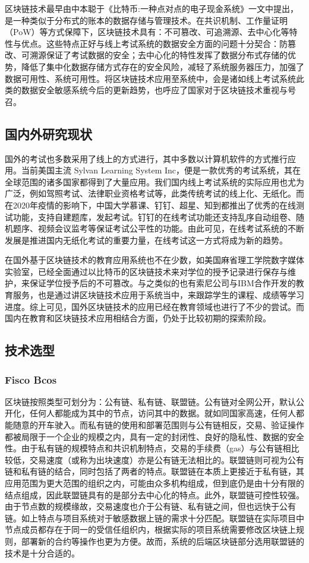 区块链技术最早由中本聪于《比特币:一种点对点的电子现金系统》一文中提出，是一种类似于分布式的账本的数据存储与管理技术。在共识机制、工作量证明（PoW）等方式保障下，区块链技术具有：不可篡改、可追溯源、去中心化等特性与优点。这些特点正好与线上考试系统的数据安全方面的问题十分契合：防篡改、可溯源保证了考试数据的安全；去中心化的特性发挥了数据分布式存储的优势，降低了集中化数据存储方式存在的安全风险，减轻了系统服务器压力，加强了数据可用性、系统可用性。将区块链技术应用至系统中，会是诸如线上考试系统此类的数据安全敏感系统今后的更新趋势，也呼应了国家对于区块链技术重视与号召。

\subsection{国内外研究现状}
国外的考试也多数采用了线上的方式进行，其中多数以计算机软件的方式推行应用。当前美国主流 Sylvan Learning System Inc，便是一款优秀的考试系统，其在全球范围的诸多国家都得到了大量应用。我们国内线上考试系统的实际应用也尤为广泛，例如驾照考试、法律职业资格考试等，此类传统考试的线上化、无纸化。而在2020年疫情的影响下，中国大学慕课、钉钉、超星、知到都推出了优秀的在线测试功能，支持自建题库，发起考试。钉钉的在线考试功能还支持乱序自动组卷、随机题序、视频会议监考等保证考试公平性的功能。由此可见，在线考试系统的不断发展是推进国内无纸化考试的重要力量，在线考试这一方式将成为新的趋势。

在国外基于区块链技术的教育应用系统也不在少数，如美国麻省理工学院数字媒体实验室，已经全面通过以比特币的区块链技术来对学位的授予记录进行保存与维护，来保证学位授予后的不可篡改。与之类似的也有索尼公司与IBM合作开发的教育服务，也是通过讲区块链技术应用于系统当中，来跟踪学生的课程、成绩等学习进度。综上可见，国外区块链技术的应用已经在教育领域也进行了不少的尝试。而国内在教育和区块链技术应用相结合方面，仍处于比较初期的探索阶段。

\subsection{技术选型}
\subsubsection{Fisco Bcos}
区块链按照类型可划分为：公有链、私有链、联盟链。公有链对全网公开，默认公开化，任何人都能成为其中的节点，访问其中的数据。就如同国家高速，任何人都能随意的开车驶入。而私有链的使用和部署范围则与公有链相反，交易、验证操作都被局限于一个企业的规模之内，具有一定的封闭性、良好的隐私性、数据的安全性。由于私有链的规模特点和共识机制特点，交易的手续费（gas）与公有链相比较低，交易速度（或称为出块速度）亦是公有链无法相比的。联盟链则可视为公有链和私有链的结合，同时包括了两者的特点。联盟链在本质上更接近于私有链，其应用范围为更大范围的组织之内，可能由众多机构组成，但到底仍是由十分有限的结点组成，因此联盟链具有的是部分去中心化的特点。此外，联盟链可控性较强。由于节点数的规模缘故，交易速度也介于公有链、私有链之间，但也远快于公有链。如上特点与项目系统对于敏感数据上链的需求十分匹配。联盟链在实际项目中节点成员都存在于同一的受信任组织内，根据实际的项目系统需要修改区块链上规则，部署新的合约等操作也更为方便。故而，系统的后端区块链部分选用联盟链的技术是十分合适的。

